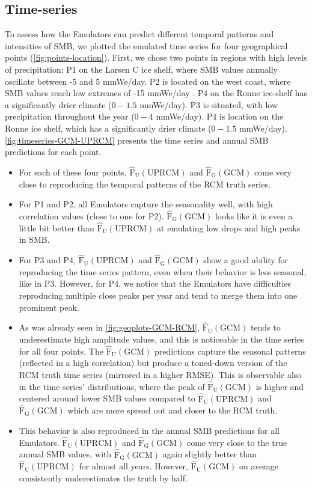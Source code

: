 \documentclass[a4paper,11pt,oneside]{report}
\begin{document}
\subsection{Time-series}\label{sec:res-time-series}
To assess how the Emulators can predict different temporal patterns and intensities of SMB, we plotted the emulated time series for four geographical points (\autoref{fig:points-location}). First, we chose two points in regions with high levels of precipitation: P1 on the Larsen C ice shelf, where SMB values annually oscillate between -5 and 5 \si{mmWe/day}. P2 is located on the west coast, where SMB values reach low extremes of -15 \si{mmWe/day} . P4 on the Ronne ice-shelf has a significantly drier climate ($0-1.5$ \si{mmWe/day}). P3 is situated, with low precipitation throughout the year ($0-4$ \si{mmWe/day}). P4 is location on the Ronne ice shelf, which has a significantly drier climate ($0-1.5$ \si{mmWe/day}). \autoref{fig:timeseries-GCM-UPRCM} presents the time series and annual SMB predictions for each point. 
\begin{itemize}
    \item For each of these four points, $\mathrm{\hat{F}_{U}(UPRCM)}$ and $\mathrm{\hat{F}_{G}(GCM)}$ come very close to reproducing the temporal patterns of the RCM truth series. 
    \item For P1 and P2, all Emulators capture the seasonality well, with high correlation values (close to one for P2). $\mathrm{\hat{F}_{G}(GCM)}$ looks like it is even a little bit better than $\mathrm{\hat{F}_{U}(UPRCM)}$ at emulating low drops and high peaks in SMB. 
    \item For P3 and P4, $\mathrm{\hat{F}_{U}(UPRCM)}$ and $\mathrm{\hat{F}_{G}(GCM)}$ show a good ability for reproducing the time series pattern, even when their behavior is less seasonal, like in P3. However, for P4, we notice that the Emulators have difficulties reproducing multiple close peaks per year and tend to merge them into one prominent peak. 
    \item As was already seen in \autoref{fig:geoplots-GCM-RCM}, $\mathrm{\hat{F}_{U}(GCM)}$ tends to underestimate high amplitude values, and this is noticeable in the time series for all four points. The $\mathrm{\hat{F}_{U}(GCM)}$ predictions capture the seasonal patterns (reflected in a high correlation) but produce a toned-down version of the RCM truth time series (mirrored in a higher RMSE). This is observable also in the time series' distributions, where the peak of $\mathrm{\hat{F}_{U}(GCM)}$ is higher and centered around lower SMB values compared to $\mathrm{\hat{F}_{U}(UPRCM)}$ and $\mathrm{\hat{F}_{G}(GCM)}$ which are more spread out and closer to the RCM truth. 
    \item This behavior is also reproduced in the annual SMB predictions for all Emulators. $\mathrm{\hat{F}_{U}(UPRCM)}$ and $\mathrm{\hat{F}_{G}(GCM)}$ come very close to the true annual SMB values, with $\mathrm{\hat{F}_{G}(GCM)}$ again slightly better than $\mathrm{\hat{F}_{U}(UPRCM)}$ for almost all years. However, $\mathrm{\hat{F}_{U}(GCM)}$ on average consistently underestimates the truth by half. 

\end{itemize}
\end{document}
